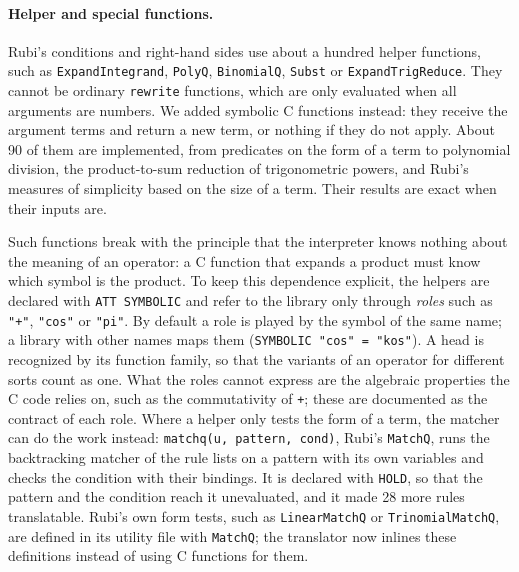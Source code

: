 \documentclass[11pt,a4paper]{article}
\begin{document}
\paragraph{Helper and special functions.} Rubi's conditions and right-hand
sides use about a hundred helper functions, such as \texttt{ExpandIntegrand},
\texttt{PolyQ}, \texttt{BinomialQ}, \texttt{Subst} or
\texttt{ExpandTrigReduce}. They cannot be ordinary \texttt{rewrite}
functions, which are only evaluated when all arguments are numbers. We
added symbolic C functions instead: they receive the argument terms and
return a new term, or nothing if they do not apply. About 90 of them are
implemented, from predicates on the form of a term to polynomial division,
the product-to-sum reduction of trigonometric powers, and Rubi's measures
of simplicity based on the size of a term. Their results are exact when
their inputs are.

Such functions break with the principle that the interpreter knows nothing
about the meaning of an operator: a C function that expands a product must
know which symbol is the product. To keep this dependence explicit, the
helpers are declared with \texttt{ATT SYMBOLIC} and refer to the library
only through \emph{roles} such as \texttt{"+"}, \texttt{"cos"} or
\texttt{"pi"}. By default a role is played by the symbol of the same name;
a library with other names maps them (\texttt{SYMBOLIC "cos" = "kos"}). A
head is recognized by its function family, so that the variants of an
operator for different sorts count as one. What the roles cannot express are
the algebraic properties the C code relies on, such as the commutativity of
\texttt{+}; these are documented as the contract of each role. Where a
helper only tests the form of a term, the matcher can do the work instead:
\texttt{matchq(u,~pattern,~cond)}, Rubi's \texttt{MatchQ}, runs the
backtracking matcher of the rule lists on a pattern with its own variables
and checks the condition with their bindings. It is declared with
\texttt{HOLD}, so that the pattern and the condition reach it unevaluated,
and it made 28 more rules translatable. Rubi's own form tests, such as
\texttt{LinearMatchQ} or \texttt{TrinomialMatchQ}, are defined in its
utility file with \texttt{MatchQ}; the translator now inlines these
definitions instead of using C functions for them.
\end{document}

